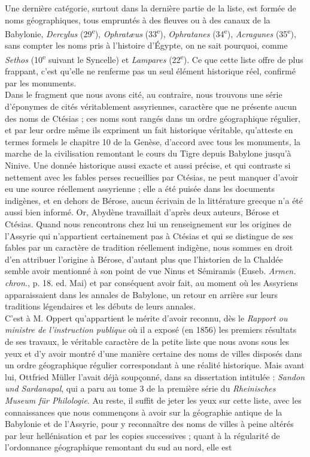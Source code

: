 \documentclass[a4paper, 11pt, oneside, landscape]{article}
\begin{document}
Une dernière catégorie, surtout dans la dernière partie de la liste, est formée de noms géographiques, tous empruntés à des fleuves ou à des canaux de la Babylonie, \emph{Dercylus} (29\textsuperscript{e}), \emph{Ophratæus} (33\textsuperscript{e}), \emph{Ophratanes} (34\textsuperscript{e}), \emph{Acragunes} (35\textsuperscript{e}), sans compter les noms pris à l'histoire d'Égypte, on ne sait pourquoi, comme \emph{Sethos} (10\textsuperscript{e} suivant le Syncelle) et \emph{Lampares} (22\textsuperscript{e}). Ce que cette liste offre de plus frappant, c'est qu'elle ne renferme pas un seul élément historique réel, confirmé par les monuments.\\\hspace*{5mm}Dans le fragment que nous avons cité, au contraire, nous trouvons une série d'éponymes de cités véritablement assyriennes, caractère que ne présente aucun des noms de Ctésias ; ces noms sont rangés dans un ordre géographique régulier, et par leur ordre même ils expriment un fait historique véritable, qu'atteste en termes formels le chapitre 10 de la Genèse, d'accord avec tous les monuments, la marche de la civilisation remontant le cours du Tigre depuis Babylone jusqu'à Ninive. Une donnée historique aussi exacte et aussi précise, et qui contraste si nettement avec les fables perses recueillies par Ctésias, ne peut manquer d'avoir eu une source réellement assyrienne ; elle a été puisée dans les documents indigènes, et en dehors de Bérose, aucun écrivain de la littérature grecque n'a été aussi bien informé. Or, Abydène travaillait d'après deux auteurs, Bérose et Ctésias. Quand nous rencontrons chez lui un renseignement sur les origines de l'Assyrie qui n'appartient certainement pas à Ctésias et qui se distingue de ses fables par un caractère de tradition réellement indigène, nous sommes en droit d'en attribuer l'origine à Bérose, d'autant plus que l'historien de la Chaldée semble avoir mentionné à son point de vue Ninus et Sémiramis (Euseb. \emph{Armen. chron.}, p. 18. ed. Mai) et par conséquent avoir fait, au moment où les Assyriens apparaissaient dans les annales de Babylone, un retour en arrière sur leurs traditions légendaires et les débuts de leurs annales.\\\hspace*{5mm}C'est à M. Oppert qu'appartient le mérite d'avoir reconnu, dès le \emph{Rapport ou ministre de l'instruction publique} où il a exposé (en 1856) les premiers résultats de ses travaux, le véritable caractère de la petite liste que nous avons sous les yeux et d'y avoir montré d'une manière certaine des noms de villes disposés dans un ordre géographique régulier correspondant à une réalité historique. Mais avant lui, Ottfried Müller l'avait déjà soupçonné, dans sa dissertation intitulée : \emph{Sandon und Sardanapal}, qui a paru au tome 3 de la première série du \emph{Rheinisches Museum für Philologie}. Au reste, il suffit de jeter les yeux sur cette liste, avec les connaissances que nous commençons à avoir sur la géographie antique de la Babylonie et de l'Assyrie, pour y reconnaître des noms de villes à peine altérés par leur hellénisation et par les copies successives ; quant à la régularité de l'ordonnance géographique remontant du sud au nord, elle est 
\end{document}
